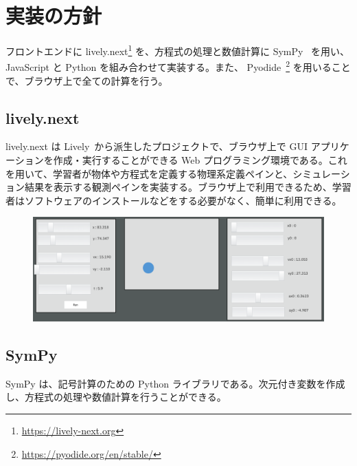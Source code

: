 \chapter{実装の方針} \label{implementation}

フロントエンドに lively.next\footnote{\url{https://lively-next.org}} を、方程式の処理と数値計算に SymPy~\cite{meurer_sympy_2017} を用い、JavaScript と Python を組み合わせて実装する。また、 Pyodide~\footnote{\url{https://pyodide.org/en/stable/}} を用いることで、ブラウザ上で全ての計算を行う。

\section{lively.next}
lively.next は Lively~\cite{ingalls_2008}から派生したプロジェクトで、ブラウザ上で GUI アプリケーションを作成・実行することができる Web プログラミング環境である。これを用いて、学習者が物体や方程式を定義する物理系定義ペインと、シミュレーション結果を表示する観測ペインを実装する。ブラウザ上で利用できるため、学習者はソフトウェアのインストールなどをする必要がなく、簡単に利用できる。

\begin{figure}[hbt]
\includegraphics[width=0.9\linewidth]{figure/lively_example.png}
\end{figure}

\section{SymPy}
SymPy は、記号計算のための Python ライブラリである。次元付き変数を作成し、方程式の処理や数値計算を行うことができる。

